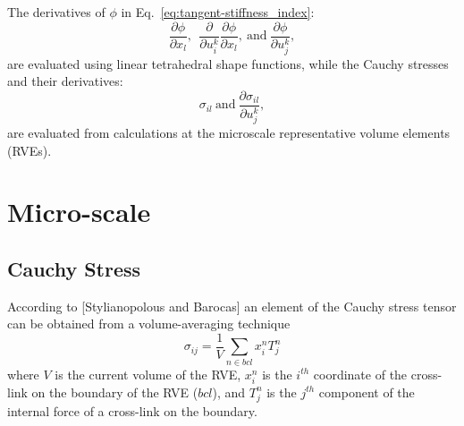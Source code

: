 \documentclass[12pt,aps,pre]{revtex4}
\begin{document}
The derivatives of $\phi$ in Eq.\ \eqref{eq:tangent-stiffness_index}:
%
\begin{equation}
\frac{\partial \phi}{\partial x_l}, \ \ \frac{\partial}{\partial u_i^k}\frac{\partial \phi}{\partial x_l}, \ \text{and} \ \frac{\partial \phi}{\partial u_j^k}, 
\label{eq:phi_terms}
\end{equation}
%
are evaluated using linear tetrahedral shape functions, while the Cauchy stresses and their derivatives:
%
\begin{equation}
\sigma_{il} \ \text{and} \ \frac{\partial \sigma_{il}}{\partial u_j^k},
\label{eq:sigma_terms}
\end{equation}
%
are evaluated from calculations at the microscale representative volume elements (RVEs).

\section{Micro-scale}
%
\subsection{Cauchy Stress}
%
According to [Stylianopolous and Barocas] an element of the Cauchy stress tensor can be obtained from a volume-averaging technique
%
\begin{equation}
\sigma_{ij} = \frac{1}{V} \sum_{n \in bcl} x_i^{n} T_j^{n} 
\label{eq:cauchy_stress_element}
\end{equation}
%
where $V$ is the current volume of the RVE, $x_i^{n}$ is the $i^{th}$ coordinate of the cross-link on the boundary of the RVE ($bcl$), and $T_j^{n}$ is the $j^{th}$ component of the internal force of a cross-link on the boundary. 
%
\end{document}
